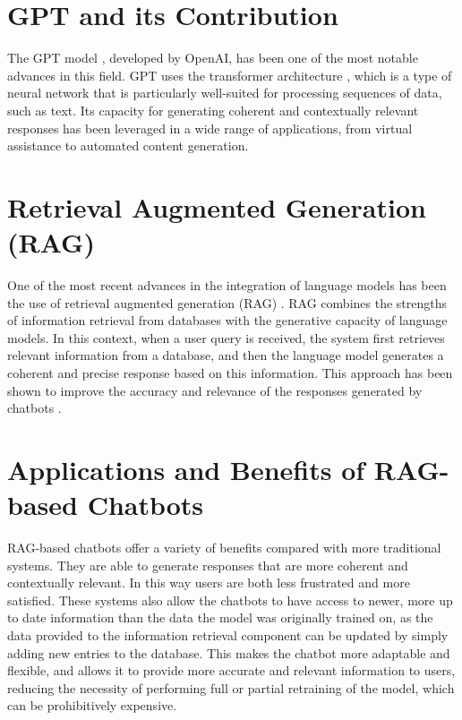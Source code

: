 \documentclass[a4paper,12pt,twoside]{ThesisStyle}
\begin{document}
\section{GPT and its Contribution}
\label{sec:gpt}

The GPT model \cite{Radford2018ImprovingLU}, developed by OpenAI, has been one of the most notable advances in this field. GPT uses the transformer architecture \cite{Vaswani2023AttentionNeed}, which is a type of neural network that is particularly well-suited for processing sequences of data, such as text. Its capacity for generating coherent and contextually relevant responses has been leveraged in a wide range of applications, from virtual assistance to automated content generation.

\section{Retrieval Augmented Generation (RAG)}
\label{sec:rag}

One of the most recent advances in the integration of language models has been the use of retrieval augmented generation (RAG) \cite{Lewis2021RetrievalAugmentedGeneration}. RAG combines the strengths of information retrieval from databases with the generative capacity of language models. In this context, when a user query is received, the system first retrieves relevant information from a database, and then the language model generates a coherent and precise response based on this information. This approach has been shown to improve the accuracy and relevance of the responses generated by chatbots \cite{Lewis2021RetrievalAugmentedGeneration}.

\section{Applications and Benefits of RAG-based Chatbots}
\label{sec:applications}

RAG-based chatbots offer a variety of benefits compared with more traditional systems. They are able to generate responses that are more coherent and contextually relevant. In this way users are both less frustrated and more satisfied. These systems also allow the chatbots to have access to newer, more up to date information than the data the model was originally trained on, as the data provided to the information retrieval component can be updated by simply adding new entries to the database. This makes the chatbot more adaptable and flexible, and allows it to provide more accurate and relevant information to users, reducing the necessity of performing full or partial retraining of the model, which can be prohibitively expensive.
\end{document}
